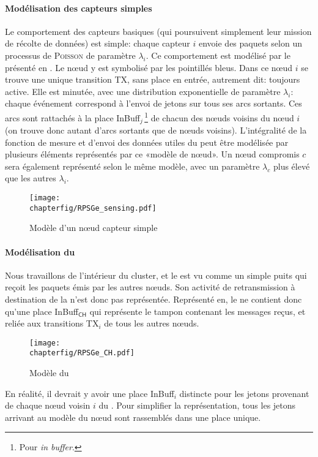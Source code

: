             \paragraph{Modélisation des capteurs simples}
Le comportement des capteurs basiques (qui poursuivent simplement leur mission de récolte de données) est simple: chaque capteur $i$ envoie des paquets selon un processus de \textsc{Poisson} de paramètre $\lambda_i$.
Ce comportement est modélisé par le \rpsg présenté en .
Le nœud y est symbolisé par les pointillés bleus.
Dans ce nœud $i$ se trouve une unique transition \textsf{TX}, sans place en entrée, autrement dit: toujours active.
Elle est minutée, avec une distribution exponentielle de paramètre $\lambda_i$: chaque événement correspond à l'envoi de jetons sur tous ses arcs sortants.
Ces arcs sont rattachés à la place \textsf{InBuff$_{j}$}\,\footnote{Pour \textit{in buffer}.} de chacun des nœuds voisins du nœud $i$ (on trouve donc autant d'arcs sortants que de nœuds voisins).
L'intégralité de la fonction de mesure et d'envoi des données utiles du \rc peut être modélisée par plusieurs éléments représentés par ce «modèle de nœud».
Un nœud compromis $c$ sera également représenté selon le même modèle, avec un paramètre $\lambda_c$ plus élevé que les autres $\lambda_i$.
\begin{figure}[!ht]
    \centering
    \texttt{[image: \\chapterfig/RPSGe\_sensing.pdf]}
    \caption{Modèle \rpsg d'un nœud capteur simple}\label{sa:fig:snodegspn}
\end{figure}

            \paragraph{Modélisation du \ch}
Nous travaillons de l'intérieur du cluster, et le \ch est vu comme un simple puits qui reçoit les paquets émis par les autres nœuds.
Son activité de retransmission à destination de la \sdb n'est donc pas représentée.
Représenté en, le \CH ne contient donc qu'une place \textsf{InBuff$_\textsf{CH}$} qui représente le tampon contenant les messages reçus, et reliée aux transitions \textsf{TX$_i$} de tous les autres nœuds.
\begin{figure}[ht]
    \centering
    \texttt{[image: \\chapterfig/RPSGe\_CH.pdf]}
    \caption{Modèle \rpsg du \ch}\label{sa:fig:chgspn}
\end{figure}
En réalité, il devrait y avoir une place \textsf{InBuff$_i$} distincte pour les jetons provenant de chaque nœud voisin $i$ du \ch. Pour simplifier la représentation, tous les jetons arrivant au modèle du nœud sont rassemblés dans une place unique.

